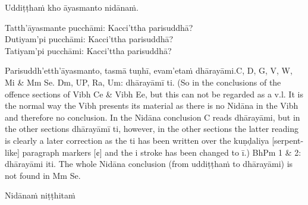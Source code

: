 \begin{center}
  Uddiṭṭhaṁ kho āyasmanto nidānaṁ.\makeatletter\hyperlink{endnote8-appendix}\makeatother

  \ifninebythirteenversion\clearpage\fi

  Tatth'āyasmante pucchāmi: Kacci'ttha parisuddhā?\\
  Dutiyam'pi pucchāmi: Kacci'ttha parisuddhā?\\
  Tatiyam'pi pucchāmi: Kacci'ttha parisuddhā?

  \smallskip

  Parisuddh'etth'āyasmanto, tasmā tuṇhī, evam'etaṁ dhārayāmi.\makeatletter\hyperlink{endnote-appendix}\makeatother C, D, G, V, W, Mi & Mm Se. Dm, UP, Ra, Um: dhārayāmī ti. (So in the conclusions of the offence sections of Vibh Ce &
Vibh Ee, but this can not be regarded as a v.l. It is the normal way the Vibh presents its material as there is no Nidāna in
the Vibh and therefore no conclusion. In the Nidāna conclusion C reads dhārayāmi, but in the other sections dhārayāmī ti,
however, in the other sections the latter reading is clearly a later correction as the ti has been written over the kuṇḍaliya
[serpent-like] paragraph markers [¢] and the i stroke has been changed to ī.)
BhPm 1 & 2: dhārayāmi iti. The whole Nidāna conclusion (from uddiṭṭhaṁ to dhārayāmi) is not found in Mm Se.
\end{center}

\begin{outro}
  Nidānaṁ niṭṭhitaṁ\makeatletter\hyperlink{endnote9-appendix}\makeatother
\end{outro}

\clearpage

